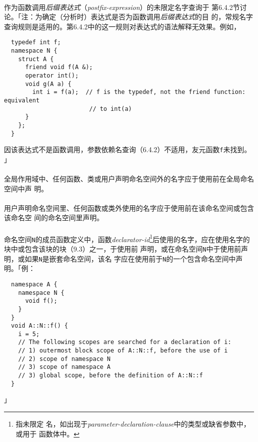 \paragraph{}
作为函数调用\textit{后缀表达式}（\textit{postfix-expression}）的未限定名字查询于
第6.4.2节讨论。「注：为确定（分析时）表达式是否为函数调用\textit{后缀表达式}的目
的，常规名字查询规则是适用的。第6.4.2中的这一规则对表达式的语法解释无效果。例如，
\begin{lstlisting}
  typedef int f;
  namespace N {
    struct A {
      friend void f(A &);
      operator int();
      void g(A a) {
        int i = f(a);  // f is the typedef, not the friend function: equivalent
                        // to int(a)
      }
    };
  }
\end{lstlisting}
因该表达式不是函数调用，参数依赖名查询（6.4.2）不适用，友元函数\texttt{f}未找到。
」

\paragraph{}
全局作用域中、任何函数、类或用户声明命名空间外的名字应于使用前在全局命名空间中声
明。

\paragraph{}
用户声明命名空间里、任何函数或类外使用的名字应于使用前在该命名空间或包含该命名空
间的命名空间里声明。

\paragraph{}
命名空间\texttt{N}的成员函数定义中，函数\textit{declarator-id}\footnote{指未限定
名，如出现于\textit{parameter-declaration-clause}中的类型或缺省参数中，或用于
函数体中。}后使用的名字，应在使用名字的块中或包含该块的块（9.3）之一，于使用前
声明，或在命名空间\texttt{N}中于使用前声明，或如果\texttt{N}是嵌套命名空间，该名
字应在使用前于\texttt{N}的一个包含命名空间中声明。「例：
\begin{lstlisting}
  namespace A {
    namespace N {
      void f();
    }
  }
  void A::N::f() {
    i = 5;
    // The following scopes are searched for a declaration of i:
    // 1) outermost block scope of A::N::f, before the use of i
    // 2) scope of namespace N
    // 3) scope of namespace A
    // 3) global scope, before the definition of A::N::f
  }
\end{lstlisting}」

